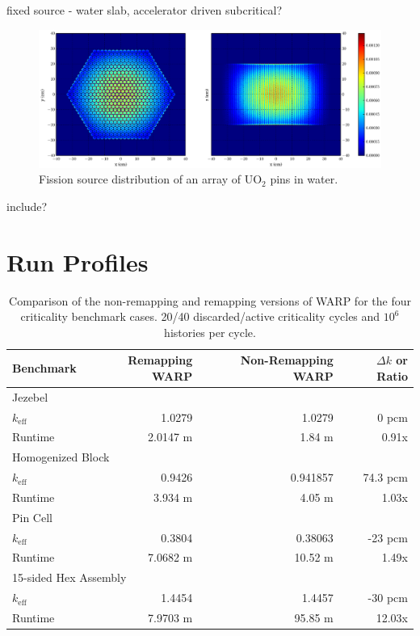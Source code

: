fixed source - water slab, accelerator driven subcritical?

\begin{figure}[h!]
\centering
\includegraphics[width=\textwidth,trim= 2cm 0cm 2cm 0cm]{graphics/finalresults/assembly_fiss-6.eps}
\caption{Fission source distribution of an array of UO$_2$ pins in water. \label{assembly_fiss} }
\end{figure}

include?


\section{Run Profiles}

\begin{table}[h]
\centering
\caption{Comparison of the non-remapping and remapping versions of WARP for the four criticality benchmark cases.  20/40 discarded/active criticality cycles and $10^6$ histories per cycle.}
\label{benchmark_nonremapping_summary}
\begin{tabular}{| l | r | r | r |}
 \hline
 Benchmark & Remapping WARP & Non-Remapping WARP & $\Delta k$ or Ratio  \\
\hline
\hline
\multicolumn{4}{|l|}{Jezebel}  \\
\hline
 $k_\mathrm{eff}$ & 1.0279 & 1.0279  & 0 pcm\\
 \hline
 Runtime               &   2.0147 m & 1.84 m & 0.91x \\
 \hline
 \hline
\multicolumn{4}{|l|}{Homogenized Block }\\
\hline
 $k_\mathrm{eff}$ & 0.9426 & 0.941857 & 74.3 pcm  \\
 \hline
 Runtime               &  3.934 m & 4.05 m & 1.03x \\
 \hline
  \hline
\multicolumn{4}{|l|}{Pin Cell}\\
\hline
 $k_\mathrm{eff}$ &  0.3804 & 0.38063  & -23 pcm \\
 \hline
 Runtime               & 7.0682 m & 10.52 m & 1.49x \\
 \hline
  \hline
\multicolumn{4}{|l|}{15-sided Hex Assembly}\\
\hline
 $k_\mathrm{eff}$  & 1.4454  & 1.4457 & -30 pcm \\
 \hline
 Runtime               & 7.9703 m & 95.85 m & 12.03x \\
 \hline
\end{tabular}
\end{table}

